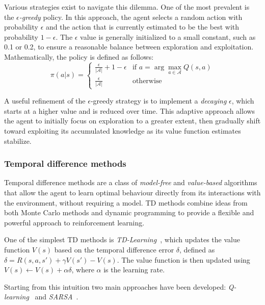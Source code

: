 Various strategies exist to navigate this dilemma. 
 One of the most prevalent is the \emph{$\epsilon$-greedy} policy. 
 In this approach, the agent selects a random action with probability \(\epsilon\) and 
 the action that is currently estimated to be the best with probability \(1 - \epsilon\). 
%
The \(\epsilon\) value is generally initialized to a small constant, such as 0.1 or 0.2, 
 to ensure a reasonable balance between exploration and exploitation. 
 Mathematically, the policy is defined as follows:
\begin{equation}
\pi(a|s) = \begin{cases}
\frac{\epsilon}{|\mathcal{A}|} + 1 - \epsilon & \text{if } a = \arg \max_{a \in \mathcal{A}} Q(s, a) \\
\frac{\epsilon}{|\mathcal{A}|} & \text{otherwise}
\end{cases}
\end{equation}

A useful refinement of the \(\epsilon\)-greedy strategy is to implement a \emph{decaying} \(\epsilon\), 
 which starts at a higher value and is reduced over time. 
 This adaptive approach allows the agent to initially focus on exploration to a greater extent, 
 then gradually shift toward exploiting its accumulated knowledge as its value function estimates stabilize.

\subsubsection{Temporal difference methods}
Temporal difference methods are a class of \emph{model-free} and \emph{value-based} algorithms 
 that allow the agent to learn optimal behaviour directly from its interactions with the environment, without requiring a model. 
 TD methods combine ideas from both Monte Carlo methods and dynamic programming to provide a flexible and powerful approach to reinforcement learning.

One of the simplest TD methods is \emph{TD-Learning}~\cite{DBLP:journals/ml/Sutton88}, 
 which updates the value function \(V(s)\) based on the temporal difference error \(\delta\), 
 defined as \( \delta = R(s, a, s') + \gamma V(s') - V(s) \). 
 The value function is then updated using \( V(s) \leftarrow V(s) + \alpha \delta \), where \(\alpha\) is the learning rate.

Starting from this intuition two main approaches have been developed: 
 \emph{Q-learning}~\cite{DBLP:journals/ml/WatkinsD92} and \emph{SARSA}~\cite{sutton-book}. 

